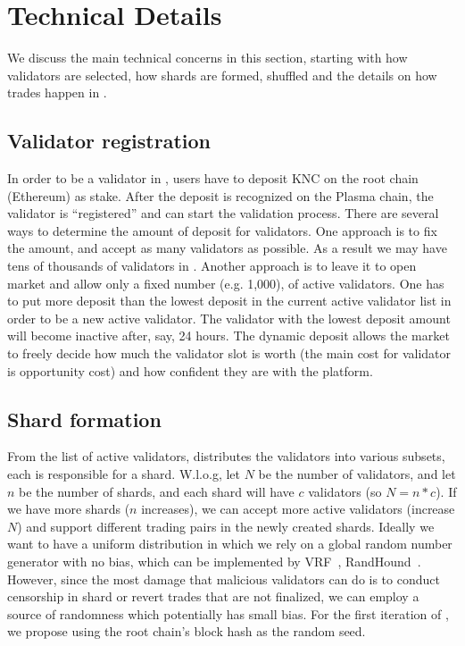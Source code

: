 \section{Technical Details}
\label{sec:details}

We discuss the main technical concerns in this section, starting with how validators are selected, how shards are formed, shuffled and the details on how trades happen in \codename.

\subsection{Validator registration}
In order to be a validator in \codename, users have to deposit KNC on the root chain (Ethereum) as stake. After the deposit is recognized on the Plasma chain, the validator is “registered” and can start the validation process. There are several ways to determine the amount of deposit for validators. One approach is to fix the amount, and accept as many validators as possible. As a result we may have tens of thousands of validators in \codename. Another approach is to leave it to open market and allow only a fixed number (e.g. 1,000), of active validators. One has to put more deposit than the lowest deposit in the current active validator list in order to be a new active validator. The validator with the lowest deposit amount will become inactive after, say, 24 hours. The dynamic deposit allows the market to freely decide how much the validator slot is worth (the main cost for validator is opportunity cost) and how confident they are with the platform.

\subsection{Shard formation}
From the list of active validators, \codename distributes the validators into various subsets, each is responsible for a shard. W.l.o.g, let $N$ be the number of validators, and let $n$ be the number of shards, and each shard will have $c$ validators (so $N = n*c$). If we have more shards ($n$ increases), we can accept more active validators (increase $N$) and support different trading pairs in the newly created shards. Ideally we want to have a uniform distribution in which we rely on a global random number generator with no bias, which can be implemented by VRF~\cite{algorand}, RandHound~\cite{randhound}. However, since the most damage that malicious validators can do is to conduct censorship in shard or revert trades that are not finalized, we can employ a source of randomness which potentially has small bias. For the first iteration of \codename, we propose using the root chain’s block hash as the random seed.

